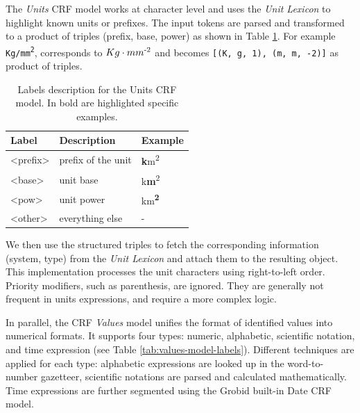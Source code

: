 \documentclass[sigconf]{acmart}
\begin{document}
The \textit{Units} CRF model works at character level and uses the \textit{Unit Lexicon} to highlight known units or prefixes. The input tokens are parsed and transformed to a product of triples (prefix, base, power) as shown in Table \ref{tab:units-model-labels}. For example \texttt{Kg/mm\textsuperscript{2}}, corresponds to \texttt{$Kg\cdot mm\textsuperscript{-2}$} and becomes \texttt{[(K, g, 1), (m, m, -2)]} as product of triples. 

\begin{table}[ht]
  \caption{Labels description for the Units CRF model. In bold are highlighted specific examples. }
  \label{tab:units-model-labels}
  \begin{tabular}{lll}
    \toprule
    Label & Description & Example\\
    \midrule
    <prefix> & prefix of the unit  & \textbf{k}m\textsuperscript{2} \\
    <base> & unit base & k\textbf{m}\textsuperscript{2}\\
    <pow> & unit power & km\textsuperscript{\textbf{2}}\\
    <other> & everything else & - \\
  \bottomrule
\end{tabular}
\end{table}

We then use the structured triples to fetch the corresponding information (system, type) from the \textit{Unit Lexicon} and attach them to the resulting object. 
This implementation processes the unit characters using right-to-left order. 
Priority modifiers, such as parenthesis, are ignored. They are generally not frequent in units expressions, and require a more complex logic.

In parallel, the CRF \textit{Values} model unifies the format of identified values into numerical formats. It supports four types: numeric, alphabetic, scientific notation, and time expression (see Table \ref{tab:values-model-labels}). Different techniques are applied for each type: alphabetic expressions are looked up in the word-to-number gazetteer, scientific notations are parsed and calculated mathematically. Time expressions are further segmented using the Grobid built-in Date CRF model.
\end{document}
